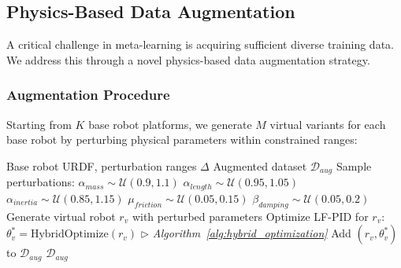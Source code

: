 \documentclass[a4paper]{cas-sc}
\begin{document}
\subsection{Physics-Based Data Augmentation}

A critical challenge in meta-learning is acquiring sufficient diverse training data. We address this through a novel physics-based data augmentation strategy.

\subsubsection{Augmentation Procedure}

Starting from $K$ base robot platforms, we generate $M$ virtual variants for each base robot by perturbing physical parameters within constrained ranges:

\begin{algorithm}[h]
\caption{Physics-Based Data Augmentation}
\label{alg:augmentation}
\begin{algorithmic}[1]
\REQUIRE Base robot URDF, perturbation ranges $\Delta$
\ENSURE Augmented dataset $\mathcal{D}_{aug}$
        \STATE Sample perturbations: 
        \STATE \quad $\alpha_{mass} \sim \mathcal{U}(0.9, 1.1)$
        \STATE \quad $\alpha_{length} \sim \mathcal{U}(0.95, 1.05)$
        \STATE \quad $\alpha_{inertia} \sim \mathcal{U}(0.85, 1.15)$
        \STATE \quad $\mu_{friction} \sim \mathcal{U}(0.05, 0.15)$
        \STATE \quad $\beta_{damping} \sim \mathcal{U}(0.05, 0.2)$
        \STATE Generate virtual robot $r_v$ with perturbed parameters
        \STATE Optimize LF-PID for $r_v$: $\theta_v^* = \text{HybridOptimize}(r_v)$ \hfill $\triangleright$ \textit{Algorithm~\ref{alg:hybrid_optimization}}
        \STATE Add $(r_v, \theta_v^*)$ to $\mathcal{D}_{aug}$
    \ENDFOR
\ENDFOR
\RETURN $\mathcal{D}_{aug}$
\end{algorithmic}
\end{algorithm}
\end{document}
